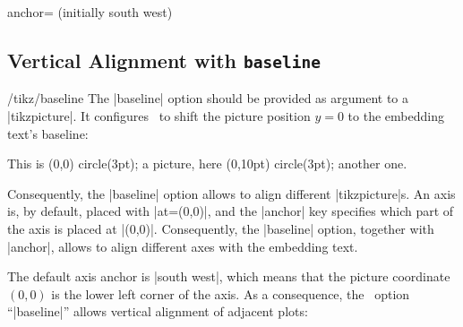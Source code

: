 \begin{pgfplotskey}{anchor= (initially south west)}
\subsection{Vertical Alignment with \texttt{baseline}}
\label{sec:align}%
\begin{key}{/tikz/baseline}
The |baseline| option should be provided as argument to a |tikzpicture|. It configures \Tikz\ to shift the picture position $y=0$ to the embedding text's baseline:
\begin{codeexample}[width=3cm]
This is \tikz[baseline]\fill[red] (0,0) circle(3pt); a picture, 
here \tikz[baseline]\fill[red] (0,10pt) circle(3pt); another one.
\end{codeexample}
\noindent Consequently, the |baseline| option allows to align different |tikzpicture|s. An axis is, by default, placed with |at={(0,0)}|, and the |anchor| key specifies which part of the axis is placed at |(0,0)|. Consequently, the |baseline| option, together with |anchor|, allows to align different axes with the embedding text.

The default axis anchor is |south west|, which means that the picture coordinate $(0,0)$ is the lower left corner of the axis. As a consequence, the \Tikz\ option ``|baseline|'' allows vertical alignment of adjacent plots:
\begin{codeexample}[]
\pgfplotsset{domain=-1:1}
%
\hspace{0.15cm}
\end{codeexample}

\begin{codeexample}[]
\pgfplotsset{domain=-1:1}
%
\hspace{0.15cm}
\end{codeexample}


\end{key}
\end{pgfplotskey}
